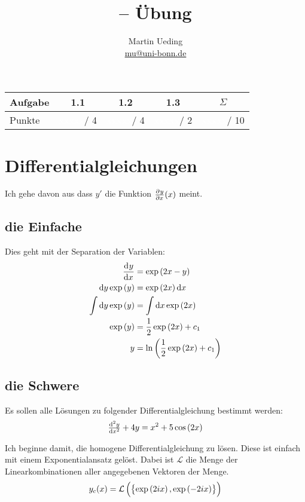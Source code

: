 \documentclass[11pt, ngerman]{article}
\title{\themodul{} -- Übung \theuebung \\ \vspace{0.5cm} \large{\thegruppe}}
\author{Martin Ueding \\ \small{\href{mailto:mu@uni-bonn.de}{mu@uni-bonn.de}}}
\newcommand{\punkte}{\textcolor{white}{xxxxx}}
\begin{document}
\maketitle

\begin{table}[h]
	\centering
	\begin{tabular}{l|c|c|c|c}
		Aufgabe & 1.1 & 1.2 & 1.3 & $\Sigma$   \\
		\hline
		Punkte & \punkte / 4 & \punkte / 4 & \punkte / 2 & \punkte / 10
	\end{tabular}
\end{table}

\section{Differentialgleichungen}

Ich gehe davon aus dass $y'$ die Funktion $\pd yx(x)$ meint.

\subsection{die Einfache}

Dies geht mit der Separation der Variablen:
%
\begin{align*}
	\dod yx &= \exp\del{2x-y} \\
	\dif y \exp\del y &= \exp\del{2x} \dif x \\
	\int \dif y \exp \del y &= \int \dif x \exp\del{2x} \\
	\exp\del y &= \frac 12 \exp\del{2x} + c_1 \\
			 y &= \ln\del{\frac 12 \exp\del{2x} + c_1}
\end{align*}


\subsection{die Schwere}

Es sollen alle Lösungen zu folgender Differentialgleichung bestimmt werden:
\[
	\od[2] yx + 4y = x^2 + 5 \cos\del{2x}
\]

\newcommand\ex{\exp\del{2ix}}

Ich beginne damit, die homogene Differentialgleichung zu lösen. Diese ist
einfach mit einem Exponentialansatz gelöst. Dabei ist $\mathcal L$ die Menge
der Linearkombinationen aller angegebenen Vektoren der Menge.
\[
	y_c(x) = \mathcal L \del{\set{\ex, \exp\del{-2ix}}}
\]
\end{document}
